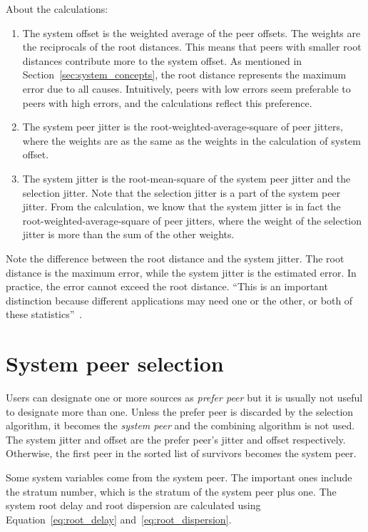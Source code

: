 About the calculations:
\begin{enumerate}
    \item The system offset is the weighted average of the peer offsets. The
        weights are the reciprocals of the root distances. This means that
        peers with smaller root distances contribute more to the system offset. As
        mentioned in Section~\ref{sec:system_concepts}, the root distance
        represents the maximum error due to all causes.  Intuitively, peers
        with low errors seem preferable to peers with high errors, and the
        calculations reflect this preference.
    \item The system peer jitter is the root-weighted-average-square of peer
        jitters, where the weights are as the same as the weights in the
        calculation of system offset.
    \item The system jitter is the root-mean-square of the system peer jitter
        and the selection jitter. Note that the selection jitter is a part of
        the system peer jitter. From the calculation, we know that the system
        jitter is in fact the root-weighted-average-square of peer jitters,
        where the weight of the selection jitter is more than the sum of the
        other weights.
\end{enumerate}
Note the difference between the root distance and the system jitter. The root
distance is the maximum error, while the system jitter is the estimated error.
In practice, the error cannot exceed the root distance. ``This is an important
distinction because different applications may need one or the other, or both
of these statistics''~\cite{redbook}.

\section{System peer selection}%
\label{sec:system_peer_selection}
Users can designate one or more sources as \emph{prefer peer} but it is
usually not useful to designate more than one. Unless the prefer peer is
discarded by the selection algorithm, it becomes the \emph{system peer} and
the combining algorithm is not used. The system jitter and offset are the
prefer peer's jitter and offset respectively. Otherwise, the first peer in
the sorted list of survivors becomes the system peer. 

Some system variables come from the system peer. The important ones
include the stratum number, which is the stratum of the system peer plus one.
The system root delay and root dispersion are calculated using
Equation~\ref{eq:root_delay} and~\ref{eq:root_dispersion}.

